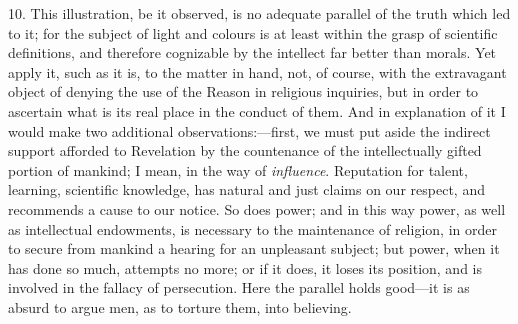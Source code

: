10. This illustration, be it observed, is no adequate parallel of
the truth which led to it; for the subject of light and colours is at
least within the grasp of scientific definitions, and therefore
cognizable by the intellect far better than morals. Yet apply it, such
as it is, to the matter in hand, not, of course, with the extravagant
object of denying the use of the Reason in religious inquiries, but in
order to ascertain what is its real place in the conduct of them. And
in explanation of it I would make two additional observations:—first,
we must put aside the indirect support afforded to Revelation by the
countenance of the intellectually gifted portion of mankind; I mean,
in the way of \emph{influence}. Reputation for talent, learning,
scientific knowledge, has natural and just claims on our respect, and
recommends a cause to our notice. So does power; and in this way
power, as well as intellectual endowments, is necessary to the
maintenance of religion, in order to secure from mankind a hearing for
an unpleasant subject; but power, when it has done so much, attempts
no more; or if it does, it loses its position, and is involved in the
fallacy of persecution. Here the parallel holds good—it is as absurd
to argue men, as to torture them, into believing.

